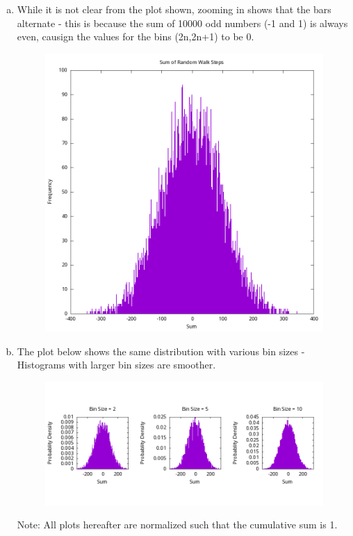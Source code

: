 \documentclass[12 pt]{article}
\begin{document}
\begin{enumerate}[a.]
\item
While it is not clear from the plot shown, zooming in shows that the bars alternate - this is because the sum of 10000 odd numbers (-1 and 1) is always even, causign the values for the bins (2n,2n+1) to be 0.
\pagebreak
\begin{figure}[htb!]
\centering\includegraphics[width=4.5in]{plots/random_walk_sum_10e4x10e4.png}
\end{figure}

\item
The plot below shows the same distribution with various bin sizes - Histograms with larger bin sizes are smoother.
\begin{figure}[htb!]
\centering\includegraphics[width=5.6in]{plots/random_walk_sum_10e4x10e4_bins.png}
\end{figure}

Note: All plots hereafter are normalized such that the cumulative sum is 1.


\end{enumerate}
\end{document}
